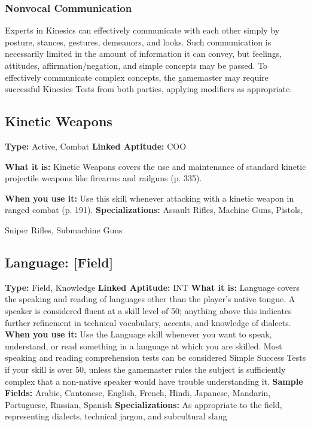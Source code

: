\subsubsection{Nonvocal Communication}

Experts in Kinesics can effectively communicate 
with each other simply by posture, stances, gestures, 
demeanors, and looks. Such communication is necessarily
limited in the amount of information it can
convey, but feelings, attitudes, affirmation/negation, 
and simple concepts may be passed. To effectively 
communicate complex concepts, the gamemaster may 
require successful Kinesics Tests from both parties, applying
modifiers as appropriate.

\subsection{Kinetic Weapons}

\textbf{Type:} Active, Combat
\textbf{Linked Aptitude:} COO

\textbf{What it is:} Kinetic Weapons covers the use and 
maintenance of standard kinetic projectile weapons 
like firearms and railguns (p. 335).

\textbf{When you use it:} Use this skill whenever attacking 
with a kinetic weapon in ranged combat (p. 191).
\textbf{Specializations:} Assault Rifles, Machine Guns, Pistols, 

Sniper Rifles, Submachine Guns

\subsection{Language: [Field]}

\textbf{Type:} Field, Knowledge
\textbf{Linked Aptitude:} INT
\textbf{What it is:} Language covers the speaking and 
reading of languages other than the player's native 
tongue. A speaker is considered fluent at a skill level 
of 50; anything above this indicates further refinement
in technical vocabulary, accents, and knowledge
of dialects.
\textbf{When you use it:} Use the Language skill whenever 
you want to speak, understand, or read something in 
a language at which you are skilled. Most speaking 
and reading comprehension tests can be considered 
Simple Success Tests if your skill is over 50, unless the 
gamemaster rules the subject is sufficiently complex 
that a non-native speaker would have trouble understanding
it.
\textbf{Sample Fields:} Arabic, Cantonese, English, French, 
Hindi, Japanese, Mandarin, Portuguese, Russian, 
Spanish
\textbf{Specializations:} As appropriate to the field, representing
dialects, technical jargon, and subcultural slang

